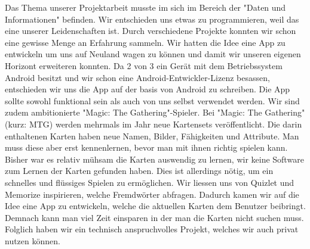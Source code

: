 Das Thema unserer Projektarbeit musste im sich im Bereich der "Daten und Informationen" befinden. Wir entschieden uns etwas zu programmieren, weil das eine unserer Leidenschaften ist. Durch verschiedene Projekte konnten wir schon eine gewisse Menge an Erfahrung sammeln. Wir hatten die Idee eine App zu entwickeln um uns auf Neuland wagen zu können und damit wir unseren eigenen Horizont erweiteren konnten. Da 2 von 3 ein Ger\"at mit dem Betriebssystem Android besitzt und wir schon eine Android-Entwickler-Lizenz besassen, entschieden wir uns die App auf der basis von Android zu schreiben. Die App sollte sowohl funktional sein als auch von uns selbst verwendet werden. Wir sind zudem ambitionierte "Magic: The Gathering"-Spieler. Bei "Magic: The Gathering" (kurz: MTG) werden mehrmals im Jahr neue Kartensets ver\"offentlicht. Die darin enthaltenen Karten haben neue Namen, Bilder, Fähigkeiten und Attribute. Man muss diese aber erst kennenlernen, bevor man mit ihnen richtig spielen kann. Bisher war es relativ m\"uhsam die Karten auswendig zu lernen, wir keine Software zum Lernen der Karten gefunden haben. Dies ist allerdings n\"otig, um ein schnelles und fl\"ussiges Spielen zu ermöglichen. Wir liessen uns von Quizlet und Memorize inspirieren, welche Fremdw\"orter abfragen. Dadurch kamen wir auf die Idee eine App zu entwickeln, welche die aktuellen Karten dem Benutzer beibringt. Demnach kann man viel Zeit einsparen in der man die Karten nicht suchen muss. Folglich haben wir ein technisch anspruchvolles Projekt, welches wir auch privat nutzen k\"onnen.